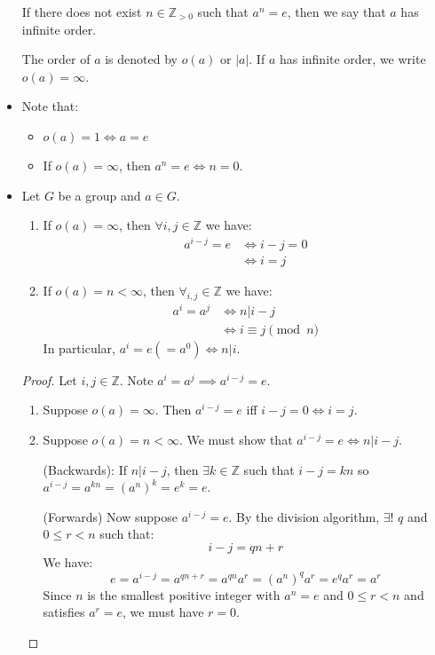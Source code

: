 \begin{itemize}
\begin{definition}
        If there does not exist $n\in \mathbb{Z}_{>0}$ such that $a^n=e$, then we say that $a$ has infinite order.
        \vspace{2mm}

        The order of $a$ is denoted by $o(a)$ or $|a|$. If $a$ has infinite order, we write $o(a)=\infty$.
    \end{definition}
    \item Note that:
    \begin{itemize}
        \item $o(a)=1 \iff a=e$
        \item If $o(a)=\infty$, then $a^n=e \iff n=0$.
    \end{itemize}
    \item Let $G$ be a group and $a\in G$.
    \begin{enumerate}
        \item If $o(a)=\infty$, then $\forall i,j \in \mathbb{Z}$ we have:
        \begin{align}
            a^{i-j} = e &\iff i-j=0 \\ 
            &\iff i=j
        \end{align}
        \item If $o(a) = n <\infty$, then $\forall_{i,j}\in \mathbb{Z}$ we have:
        \begin{align}
            a^i = a^j &\iff n|i-j \\ 
            &\iff i\equiv j \pmod{n}
        \end{align}
        In particular, $a^i=e (=a^0) \iff n | i$.
    \end{enumerate}
    \begin{proof}
        Let $i,j\in \mathbb{Z}$. Note $a^i=a^j \implies a^{i-j}=e$.
        \begin{enumerate}
            \item Suppose $o(a)=\infty$. Then $a^{i-j}=e$ iff $i-j=0 \iff i=j$.
            \item Suppose $o(a)=n<\infty$. We must show that $a^{i-j}=e \iff n|i-j$.
            
            (Backwards): If $n|i-j$, then $\exists k \in \mathbb{Z}$ such that $i-j=kn$ so $a^{i-j} = a^{kn}=(a^n)^k = e^k=e$.

            (Forwards) Now suppose $a^{i-j}=e$. By the division algorithm, $\exists!$ $q$ and $0 \le r < n$ such that:
            \begin{equation}
                i-j = qn+r
            \end{equation}
            We have:
            \begin{equation}
                e = a^{i-j}=a^{qn+r}=a^{qn}a^{r} = (a^n)^q a^r = e^qa^r = a^r
            \end{equation}
            Since $n$ is the smallest positive integer with $a^n=e$ and $0 \le r < n$ and satisfies $a^r=e$, we must have $r=0$.


\end{enumerate}
\end{proof}
\end{itemize}
